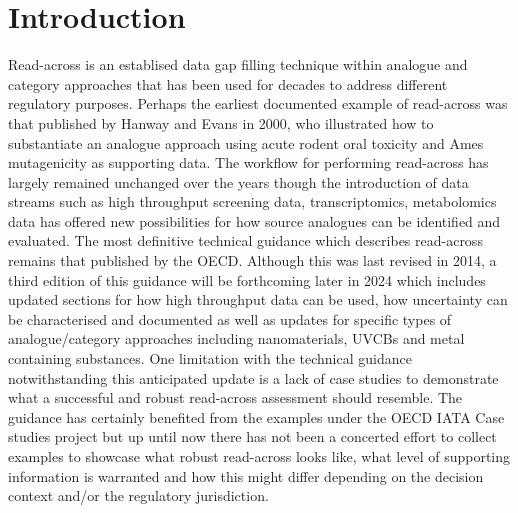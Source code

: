 \documentclass[
  super,
  preprint,
  3p]{elsarticle}
\begin{document}
\section{Introduction}\label{introduction}

Read-across is an establised data gap filling technique within analogue
and category approaches that has been used for decades to address
different regulatory purposes. Perhaps the earliest documented example
of read-across was that published by Hanway and Evans in 2000, who
illustrated how to substantiate an analogue approach using acute rodent
oral toxicity and Ames mutagenicity as supporting data. The workflow for
performing read-across has largely remained unchanged over the years
though the introduction of data streams such as high throughput
screening data, transcriptomics, metabolomics data has offered new
possibilities for how source analogues can be identified and evaluated.
The most definitive technical guidance which describes read-across
remains that published by the OECD. Although this was last revised in
2014, a third edition of this guidance will be forthcoming later in 2024
which includes updated sections for how high throughput data can be
used, how uncertainty can be characterised and documented as well as
updates for specific types of analogue/category approaches including
nanomaterials, UVCBs and metal containing substances. One limitation
with the technical guidance notwithstanding this anticipated update is a
lack of case studies to demonstrate what a successful and robust
read-across assessment should resemble. The guidance has certainly
benefited from the examples under the OECD IATA Case studies project but
up until now there has not been a concerted effort to collect examples
to showcase what robust read-across looks like, what level of supporting
information is warranted and how this might differ depending on the
decision context and/or the regulatory jurisdiction.
\end{document}
